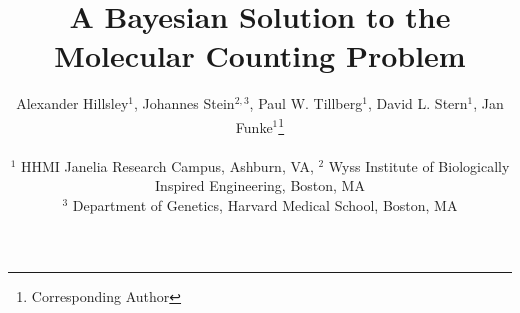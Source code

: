 \documentclass[twocolumn]{article}
\begin{document}
\title{A Bayesian Solution to the Molecular Counting Problem}

\author{
  Alexander Hillsley$^{1}$,
  Johannes Stein$^{2,3}$,
  Paul W. Tillberg$^{1}$,
  David L. Stern$^{1}$,
  Jan Funke$^{1}$\thanks{Corresponding Author}
  \\\\
  \normalsize{$^1$ HHMI Janelia Research Campus, Ashburn, VA},
  \normalsize{$^2$ Wyss Institute of Biologically Inspired Engineering, Boston, MA} \\
  \normalsize{$^3$ Department of Genetics, Harvard Medical School, Boston, MA}
  }

\maketitle











{
  \small
  
  
}

\clearpage
% 
\end{document}

